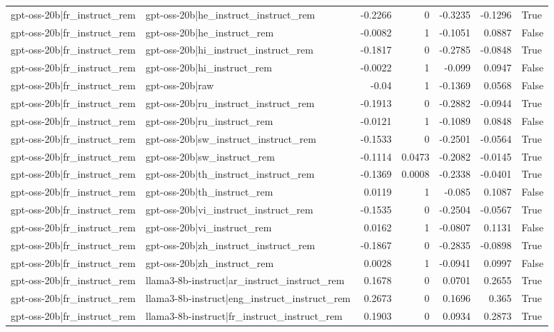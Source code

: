 \begin{table}
\begin{tabular}{l l r r r r l}
gpt-oss-20b|fr_instruct_rem & gpt-oss-20b|he_instruct_instruct_rem & -0.2266 & 0 & -0.3235 & -0.1296 & True \\
gpt-oss-20b|fr_instruct_rem & gpt-oss-20b|he_instruct_rem & -0.0082 & 1 & -0.1051 & 0.0887 & False \\
gpt-oss-20b|fr_instruct_rem & gpt-oss-20b|hi_instruct_instruct_rem & -0.1817 & 0 & -0.2785 & -0.0848 & True \\
gpt-oss-20b|fr_instruct_rem & gpt-oss-20b|hi_instruct_rem & -0.0022 & 1 & -0.099 & 0.0947 & False \\
gpt-oss-20b|fr_instruct_rem & gpt-oss-20b|raw & -0.04 & 1 & -0.1369 & 0.0568 & False \\
gpt-oss-20b|fr_instruct_rem & gpt-oss-20b|ru_instruct_instruct_rem & -0.1913 & 0 & -0.2882 & -0.0944 & True \\
gpt-oss-20b|fr_instruct_rem & gpt-oss-20b|ru_instruct_rem & -0.0121 & 1 & -0.1089 & 0.0848 & False \\
gpt-oss-20b|fr_instruct_rem & gpt-oss-20b|sw_instruct_instruct_rem & -0.1533 & 0 & -0.2501 & -0.0564 & True \\
gpt-oss-20b|fr_instruct_rem & gpt-oss-20b|sw_instruct_rem & -0.1114 & 0.0473 & -0.2082 & -0.0145 & True \\
gpt-oss-20b|fr_instruct_rem & gpt-oss-20b|th_instruct_instruct_rem & -0.1369 & 0.0008 & -0.2338 & -0.0401 & True \\
gpt-oss-20b|fr_instruct_rem & gpt-oss-20b|th_instruct_rem & 0.0119 & 1 & -0.085 & 0.1087 & False \\
gpt-oss-20b|fr_instruct_rem & gpt-oss-20b|vi_instruct_instruct_rem & -0.1535 & 0 & -0.2504 & -0.0567 & True \\
gpt-oss-20b|fr_instruct_rem & gpt-oss-20b|vi_instruct_rem & 0.0162 & 1 & -0.0807 & 0.1131 & False \\
gpt-oss-20b|fr_instruct_rem & gpt-oss-20b|zh_instruct_instruct_rem & -0.1867 & 0 & -0.2835 & -0.0898 & True \\
gpt-oss-20b|fr_instruct_rem & gpt-oss-20b|zh_instruct_rem & 0.0028 & 1 & -0.0941 & 0.0997 & False \\
gpt-oss-20b|fr_instruct_rem & llama3-8b-instruct|ar_instruct_instruct_rem & 0.1678 & 0 & 0.0701 & 0.2655 & True \\
gpt-oss-20b|fr_instruct_rem & llama3-8b-instruct|eng_instruct_instruct_rem & 0.2673 & 0 & 0.1696 & 0.365 & True \\
gpt-oss-20b|fr_instruct_rem & llama3-8b-instruct|fr_instruct_instruct_rem & 0.1903 & 0 & 0.0934 & 0.2873 & True \\

\end{tabular}
\end{table}
